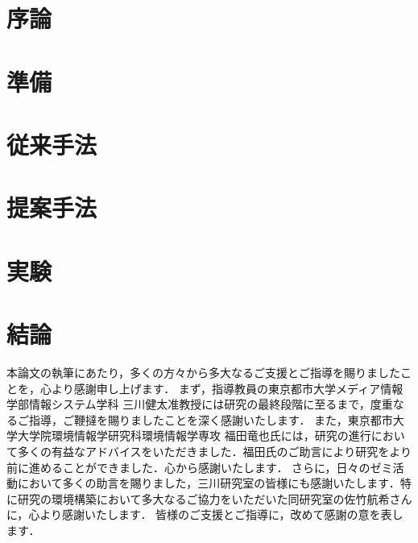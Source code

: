 \documentclass[12pt,uplatex]{jsarticle}   %
\begin{document}
\section{序論}


\section{準備}


\section{従来手法}


\section{提案手法}


\section{実験}


\section{結論}



\acknowledgements
本論文の執筆にあたり，多くの方々から多大なるご支援とご指導を賜りましたことを，心より感謝申し上げます．
まず，指導教員の東京都市大学メディア情報学部情報システム学科 三川健太准教授には研究の最終段階に至るまで，度重なるご指導，ご鞭撻を賜りましたことを深く感謝いたします．
また，東京都市大学大学院環境情報学研究科環境情報学専攻 福田竜也氏には，研究の進行において多くの有益なアドバイスをいただきました．福田氏のご助言により研究をより前に進めることができました．心から感謝いたします．
さらに，日々のゼミ活動において多くの助言を賜りました，三川研究室の皆様にも感謝いたします．特に研究の環境構築において多大なるご協力をいただいた同研究室の佐竹航希さんに，心より感謝いたします．
皆様のご支援とご指導に，改めて感謝の意を表します．



\appendix

\end{document}
